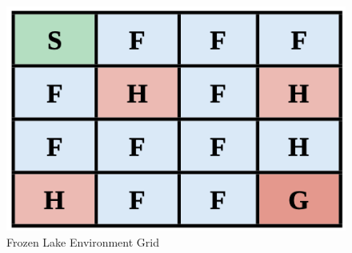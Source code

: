 \documentclass[final]{anthology-ch}         %
\begin{document}
\label{frozen_lake}


\begin{figure}[ht]
\centering
\includegraphics[width=0.35\linewidth]{frozenlake-table.png}
\caption{Frozen Lake Environment Grid}
\label{tab:frozen_lake}
\end{figure}


\end{document}
